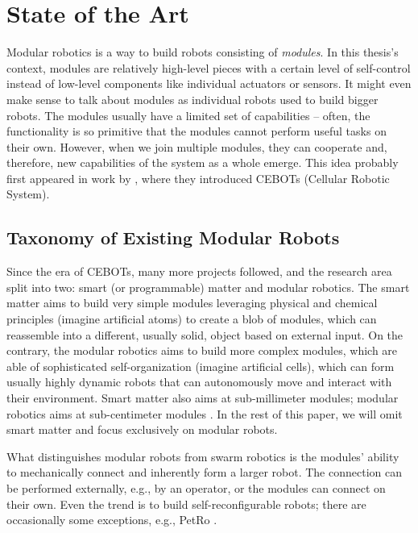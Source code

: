 \chapter{State of the Art}\label{chap:state-of-the-art}

Modular robotics is a way to build robots consisting of \emph{modules}. In this
thesis's context, modules are relatively high-level pieces with a certain level
of self-control instead of low-level components like individual actuators or
sensors. It might even make sense to talk about modules as individual robots
used to build bigger robots. The modules usually have a limited set of
capabilities -- often, the functionality is so primitive that the modules
cannot perform useful tasks on their own. However, when we join multiple
modules, they can cooperate and, therefore, new capabilities of the system as a
whole emerge. This idea probably first appeared in work by
\textcite{DBLP:conf/icra/FukudaK90}, where they introduced CEBOTs (Cellular
Robotic System).

\section{Taxonomy of Existing Modular Robots}

Since the era of CEBOTs, many more projects followed, and the research area
split into two: smart (or programmable) matter and modular robotics. The smart
matter aims to build very simple modules leveraging physical and chemical
principles (imagine artificial atoms) to create a blob of modules, which can
reassemble into a different, usually solid, object based on external input. On
the contrary, the modular robotics aims to build more complex modules, which
are able of sophisticated self-organization (imagine artificial cells), which
can form usually highly dynamic robots that can autonomously move and interact
with their environment. Smart matter also aims at sub-millimeter modules;
modular robotics aims at sub-centimeter modules
\cite{DBLP:conf/ieeealife/Christensen07, 1285597}. In the rest of this paper, we
will omit smart matter and focus exclusively on modular robots.

What distinguishes modular robots from swarm robotics is the modules' ability to
mechanically connect and inherently form a larger robot. The connection can be
performed externally, e.g., by an operator, or the modules can connect on their
own. Even the trend is to build self-reconfigurable robots; there are
occasionally some exceptions, e.g., PetRo \cite{DBLP:conf/ro-man/Salem14}.

